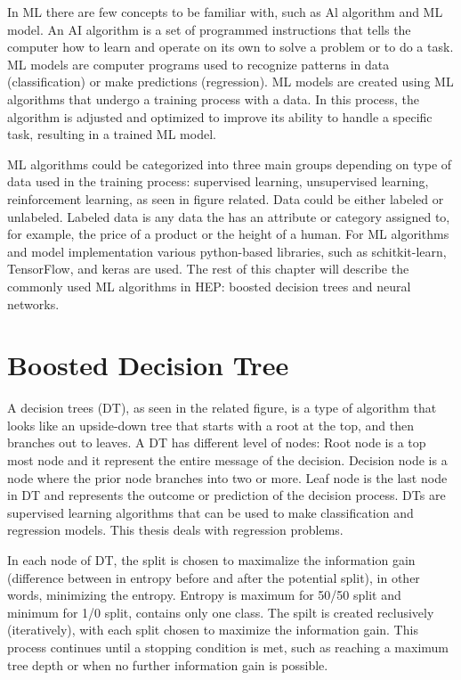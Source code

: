 In ML there are few concepts to be familiar with, such as Al algorithm and ML model.
An AI algorithm is a set of programmed instructions that tells the computer how to learn and operate on its own %
to solve a problem or to do a task.
ML models are computer programs used to recognize patterns in data (classification) or make predictions (regression).
ML models are created using ML algorithms that undergo a training process with a data.
In this process, the algorithm is adjusted and optimized to improve its ability to handle a specific task, resulting in a trained ML model.

ML algorithms could be categorized into three main groups depending on type of data used in the training process: supervised learning, unsupervised learning, reinforcement learning, as seen in figure related. %
Data could be either labeled or unlabeled.
Labeled data is any data the has an attribute or category assigned to, for example, the price of a product or the height of a human.
For ML algorithms and model implementation various python-based libraries, such as schitkit-learn, TensorFlow, and keras are used.
The rest of this chapter will describe the commonly used ML algorithms in HEP: %
boosted decision trees and neural networks.

\section{Boosted Decision Tree}
A decision trees (DT), as seen in the related figure, is a type of algorithm that looks like an upside-down tree that starts with a root at the top, and then branches out to leaves.
A DT has different level of nodes: Root node is a top most node and it represent the entire message of the decision.
Decision node is a node where the prior node branches into two or more.
Leaf node is the last node in DT and represents the outcome or prediction of the decision process.
DTs are supervised learning algorithms that can be used to make classification and regression models.
This thesis deals with regression problems.

In each node of DT, the split is chosen to maximalize the information gain (difference between in entropy before and after the potential split), in other words, minimizing the entropy.
Entropy is maximum for 50/50 split and minimum for 1/0 split, \ie contains only one class.
The spilt is created reclusively (iteratively), with each split chosen to maximize the information gain.
This process continues until a stopping condition is met, such as reaching a maximum tree depth or when no further information gain is possible.

